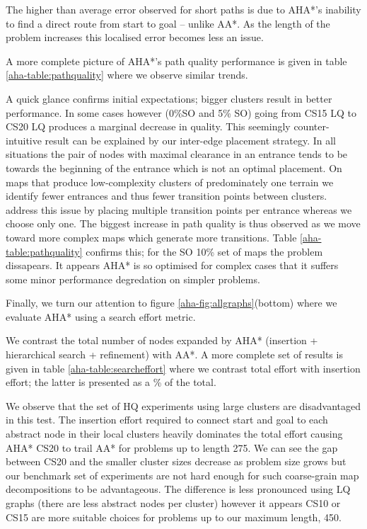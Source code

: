 The higher than average error observed for short paths is due to AHA*'s inability to find a direct route from start to goal -- unlike AA*.
As the length of the problem increases this localised error becomes less an issue.
\par \indent
A more complete picture of AHA*'s path quality performance is given in table \ref{aha-table:pathquality} where we observe similar trends. 

A quick glance confirms initial expectations; bigger clusters result in better performance. 
In some cases however (0\%SO and 5\% SO) going from CS15 LQ to CS20 LQ produces a marginal decrease in quality. 
This seemingly counter-intuitive result can be explained by our inter-edge placement strategy. 
In all situations the pair of nodes with maximal clearance in an entrance tends to be towards the beginning of the entrance which is not an optimal placement. 
On maps that produce low-complexity clusters of predominately one terrain we identify fewer entrances and thus fewer transition points between clusters. 
\cite{botea04} address this issue by placing multiple transition points per entrance whereas we choose only one. 
The biggest increase in path quality is thus observed as we move toward more complex maps which generate more transitions. 
Table \ref{aha-table:pathquality} confirms this; for the SO 10\% set of maps the problem dissapears. 
It appears AHA* is so optimised for complex cases that it suffers some minor performance degredation on simpler problems. 
\par \indent
Finally, we turn our attention to figure \ref{aha-fig:allgraphs}(bottom) where we evaluate AHA* using a search effort metric. 

We contrast the total number of nodes expanded by AHA* (insertion + hierarchical search + refinement) with AA*.
A more complete set of results is given in table \ref{aha-table:searcheffort} where we contrast total effort with insertion effort; the latter is presented as a \% of the total.
\par \indent
We observe that the set of HQ experiments using large clusters are disadvantaged in this test. 
The insertion effort required to connect start and goal to each abstract node in their local clusters heavily dominates the total effort causing AHA* CS20 to trail AA* for problems up to length 275.
We can see the gap between CS20 and the smaller cluster sizes decrease as problem size grows but our benchmark set of experiments are not hard enough for such coarse-grain map decompositions to be advantageous. 
The difference is less pronounced using LQ graphs (there are less abstract nodes per cluster) however it appears CS10 or CS15 are more suitable choices for problems up to our maximum length, 450.
